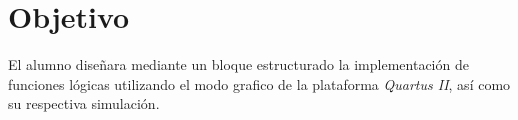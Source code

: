 \documentclass[../main.tex]{subfiles}
\begin{document}
\section{Objetivo}
El alumno diseñara mediante un bloque estructurado la implementación de 
funciones lógicas utilizando el modo grafico de la plataforma \textit{Quartus 
II}, así como su respectiva simulación.
\end{document}
